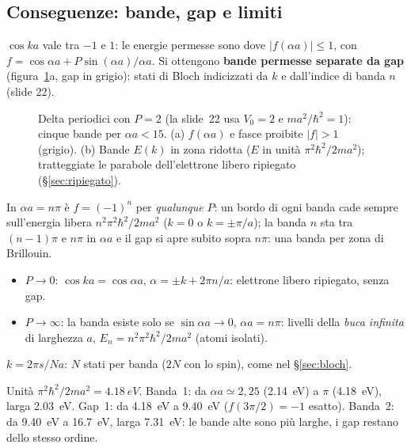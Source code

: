 \documentclass[11pt,a4paper]{article}
\begin{document}
\subsection{Conseguenze: bande, gap e limiti}
$\cos ka$ vale tra $-1$ e $1$: le energie permesse sono dove $|f(\alpha a)|\le1$, con $f=\cos\alpha a+P\sin(\alpha a)/\alpha a$. Si ottengono \textbf{bande permesse
separate da gap} (figura~\ref{fig:kpbande}a, gap in grigio): stati di Bloch indicizzati da $k$ e dall'indice di banda $n$ (slide 22).

\begin{figure}[tbp]
\centering
{}
\caption{Delta periodici con $P=2$ (la slide~22 usa $V_0=2$ e $ma^2/\hbar^2=1$): cinque bande per $\alpha a<15$. (a) $f(\alpha a)$ e fasce proibite $|f|>1$ (grigio).
(b) Bande $E(k)$ in zona ridotta ($E$ in unità $\pi^2\hbar^2/2ma^2$); tratteggiate le parabole dell'elettrone libero ripiegato (§\ref{sec:ripiegato}).}\label{fig:kpbande}
\end{figure}

In $\alpha a=n\pi$ è $f=(-1)^n$ per \emph{qualunque} $P$: un bordo di ogni banda cade sempre sull'energia libera $n^2\pi^2\hbar^2/2ma^2$ ($k=0$ o
$k=\pm\pi/a$); la banda $n$ sta tra $(n-1)\pi$ e $n\pi$ in $\alpha a$ e il gap si apre subito sopra $n\pi$: una banda per zona di Brillouin.

\begin{itemize}[leftmargin=*]
\item $P\to0$: $\cos ka=\cos\alpha a$, $\alpha=\pm k+2\pi n/a$: elettrone libero ripiegato, senza gap.
\item $P\to\infty$: la banda esiste solo se $\sin\alpha a\to0$, $\alpha a=n\pi$: livelli della \emph{buca infinita} di larghezza $a$, $E_n=n^2\pi^2\hbar^2/2ma^2$ (atomi isolati).
\end{itemize}

$k=2\pi s/Na$: $N$ stati per banda ($2N$ con lo spin), come nel §\ref{sec:bloch}.

\begin{esempio}[$a=\SI{3}{\angstrom}$, $P=3\pi/2$]
Unità $\pi^2\hbar^2/2ma^2=\SI{4.18}{eV}$. Banda~1: da $\alpha a\simeq2{,}25$ (\SI{2.14}{eV}) a $\pi$ (\SI{4.18}{eV}), larga \SI{2.03}{eV}. Gap~1: da \SI{4.18}{eV} a \SI{9.40}{eV}
($f(3\pi/2)=-1$ esatto). Banda~2: da \SI{9.40}{eV} a \SI{16.7}{eV}, larga \SI{7.31}{eV}: le bande alte sono più larghe, i gap restano dello stesso ordine.
\end{esempio}
\end{document}
